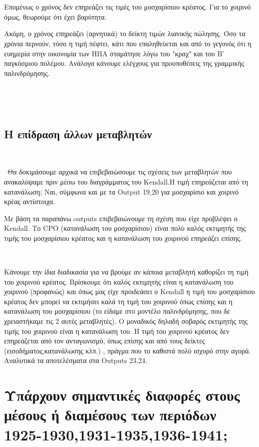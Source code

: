 \documentclass[10pt]{article}
\begin{document}
\

\

Επομένως ο χρόνος δεν επηρεάζει τις τιμές του μοσχαρίσιου κρέατος. Για το χοιρινό όμως, θεωρούμε ότι έχει βαρύτητα.

Ακόμη, ο χρόνος  επηρεάζει (αρνητικά)  το δείκτη τιμών λιανικής πώλησης. Όσο τα χρόνια περνούν, τόσο η τιμή πέφτει, κάτι που επαληθεύεται και από το γεγονός ότι η ευημερία στην οικονομία των ΗΠΑ σταμάτησε λόγω του "κραχ" και του Β' παγκόσμιου πολέμου.
Ανάλογα κάνουμε ελέγχους για προυποθέσεις της γραμμικής παλινδρόμησης.

\

\

\subsection{Η επίδραση άλλων μεταβλητών}
\

\
Θα δοκιμάσουμε αρχικά να επιβεβαιώσουμε τις σχέσεις των μεταβλητών που ανακαλύψαμε πριν μέσω του διαγράμματος του Kendall.Η τιμή επηρεάζεται από τη κατανάλωση; Ναι, σύμφωνα και με τα Output 19,20 για μοσχαρίσιο και χοιρινό κρέας αντίστοιχα.

Με βάση τα παραπάνω outputs επιβεβαιώνουμε τη σχέση που είχε προβλέψει ο Kendall. Το CPO (κατανάλωση του  μοσχαρίσιου) είναι πολύ καλός εκτιμητής της τιμής του μοσχαρίσιου κρέατος και η κατανάλωση του χοιρινού επηρεάζει επίσης.


\



Κάνουμε την ίδια διαδικασία για να βρούμε αν κάποια μεταβλητή καθορίζει τη τιμή του χοιρινού κρέατος. Βρίσκουμε ότι καλός εκτιμητής είναι η κατανάλωση του χοιρινού (προφανώς) και όπως μας είχε προιδεάσει ο Kendall η τιμή του μοσχαρίσιου κρέατος δεν μπορεί να εκτιμήσει καλά τη τιμή του χοιρινού όπως επίσης και η κατανάλωση του μοσχαρίσιου (το είδαμε στο μοντέλο παλινδρόμησης, που δε χρειαστήκαμε τις 2 αυτές μεταβλητές). Ο μοναδικός δηλαδή σοβαρός εκτιμητής της τιμής του χοιρινού είναι η κατανάλωση του. Η τιμή του χοιρινού κρέατος δεν επηρεάζεται από τον ανταγωνισμό, όπως επίσης και από τους δείκτες (εισοδήματος,κατανάλωσης κλπ.) , πράγμα που το καθιστά πολύ ισχυρό στην αγορά. Αναλυτικά τα αποτελέσματα στα Outputs 23,24.

\section{Υπάρχουν σημαντικές διαφορές στους μέσους ή διαμέσους των περιόδων 1925-1930,1931-1935,1936-1941;}
\end{document}

